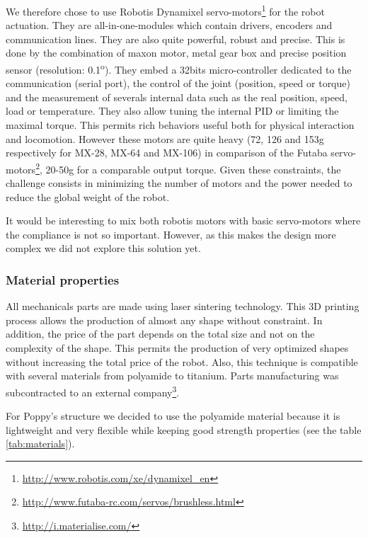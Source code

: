 We therefore chose to use Robotis Dynamixel servo-motors\footnote{\url{http://www.robotis.com/xe/dynamixel_en}} for the robot actuation. They are all-in-one-modules which contain drivers, encoders and communication lines. They are also quite powerful, robust and precise. This is done by the combination of maxon motor, metal gear box and precise position sensor (resolution: 0.1\textsuperscript{o}). They embed a 32bits micro-controller dedicated to the communication (serial port), the control of the joint (position, speed or torque) and the measurement of severals internal data such as the real position, speed, load or temperature. They also allow tuning the internal PID or limiting the maximal torque. This permits rich behaviors useful both for physical interaction and locomotion. However these motors are quite heavy (72, 126 and 153g respectively for MX-28, MX-64 and MX-106) in comparison of the Futaba servo-motors\footnote{\url{http://www.futaba-rc.com/servos/brushless.html}}, 20-50g for a comparable output torque. Given these constraints, the challenge consists in minimizing the number of motors and the power needed to reduce the global weight of the robot.

It would be interesting to mix both robotis motors with basic servo-motors where the compliance is not so important. However, as this makes the design more complex we did not explore this solution yet.


\subsubsection{Material properties} %
\label{ssub:material_properties}

All mechanicals parts are made using laser sintering technology. This 3D printing process allows the production of almost any shape without constraint. In addition, the price of the part depends on the total size and not on the complexity of the shape. This permits the production of very optimized shapes without increasing the total price of the robot. Also, this technique is compatible with several materials from polyamide to titanium. Parts manufacturing was subcontracted to an external company\footnote{\url{http://i.materialise.com/}}.

For Poppy's structure we decided to use the polyamide material because it is lightweight and very flexible while keeping good strength properties (see the table \ref{tab:materials}).

